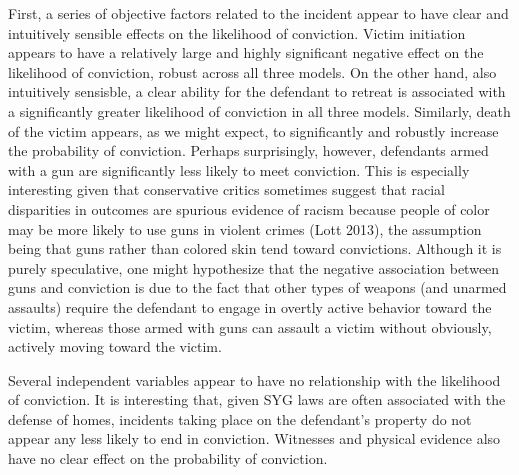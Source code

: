 \documentclass[12pt,article]{article}
\begin{document}
First, a series of objective factors related to the incident appear to
have clear and intuitively sensible effects on the likelihood of
conviction. Victim initiation appears to have a relatively large and
highly significant negative effect on the likelihood of conviction,
robust across all three models. On the other hand, also intuitively
sensisble, a clear ability for the defendant to retreat is associated
with a significantly greater likelihood of conviction in all three
models. Similarly, death of the victim appears, as we might expect, to
significantly and robustly increase the probability of conviction.
Perhaps surprisingly, however, defendants armed with a gun are
significantly less likely to meet conviction. This is especially
interesting given that conservative critics sometimes suggest that
racial disparities in outcomes are spurious evidence of racism because
people of color may be more likely to use guns in violent crimes (Lott
2013), the assumption being that guns rather than colored skin tend
toward convictions. Although it is purely speculative, one might
hypothesize that the negative association between guns and conviction is
due to the fact that other types of weapons (and unarmed assaults)
require the defendant to engage in overtly active behavior toward the
victim, whereas those armed with guns can assault a victim without
obviously, actively moving toward the victim.

Several independent variables appear to have no relationship with the
likelihood of conviction. It is interesting that, given SYG laws are
often associated with the defense of homes, incidents taking place on
the defendant's property do not appear any less likely to end in
conviction. Witnesses and physical evidence also have no clear effect on
the probability of conviction.
\end{document}
